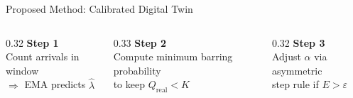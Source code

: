 \documentclass[aspectratio=169,t]{beamer}
\newcommand{\qreal}{Q_{\mathrm{real}}}
\begin{document}
\begin{frame}{Proposed Method: Calibrated Digital Twin}
  \vspace{6pt}
  \begin{columns}[c]
    \begin{column}{0.32\textwidth}\centering
      \footnotesize\textbf{Step 1}\\Count arrivals in window\\$\Rightarrow$ EMA predicts $\hat\lambda$
    \end{column}
    \begin{column}{0.33\textwidth}\centering
      \footnotesize\textbf{Step 2}\\Compute minimum barring probability\\to keep $\qreal < K$
    \end{column}
    \begin{column}{0.32\textwidth}\centering
      \footnotesize\textbf{Step 3}\\Adjust $\alpha$ via asymmetric\\step rule if $E > \varepsilon$
    \end{column}
  \end{columns}

\end{frame}
\end{document}

